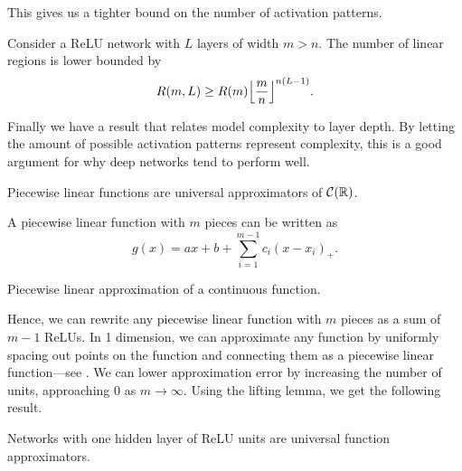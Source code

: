 This gives us a tighter bound on the number of activation patterns.

\begin{theorem}
    Consider a ReLU network with $L$ layers of width $m > n$. The number of linear regions is lower bounded by \[
        R(m, L) \geq R(m) \lft\lfloor\frac{m}{n}\rgt\rfloor^{n(L-1)}.
    \]
\end{theorem}

Finally we have a result that relates model complexity to layer depth. By letting the amount of
possible activation patterns represent complexity, this is a good argument for why deep networks
tend to perform well.

\begin{theorem}
    Piecewise linear functions are universal approximators of $\mathcal{C}(\mathbb{R})$.
\end{theorem}

\begin{theorem}[Lebesgue]
    A piecewise linear function with $m$ pieces can be written as \[
        g(x) = ax + b + \sum_{i=1}^{m-1} c_i(x - x_i)_+.
    \]
\end{theorem}

\begin{marginfigure}
    \centering
    \caption{Piecewise linear approximation of a continuous function.}
    \label{fig:piecewise-linear-approx}
\end{marginfigure}

Hence, we can rewrite any piecewise linear function with $m$ pieces as a sum of $m-1$ ReLUs. In 1
dimension, we can approximate any function by uniformly spacing out points on the function and
connecting them as a piecewise linear function---see . We can
lower approximation error by increasing the number of units, approaching $0$ as $m \to \infty$.
Using the lifting lemma, we get the following result.

\begin{theorem}
    Networks with one hidden layer of ReLU units are universal function approximators.
\end{theorem}

%
